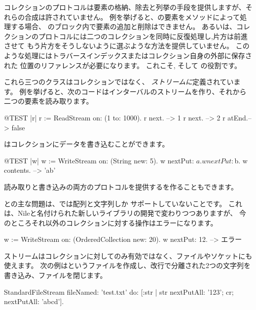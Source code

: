 \documentclass[a4paper,10pt,twoside]{book}
\begin{document}
コレクションのプロトコルは要素の格納、除去と列挙の手段を提供しますが、それらの合成は許されていません。
例を挙げると、の要素をメソッドによって処理する場合、
のブロック内で要素の追加と削除はできません。
あるいは、コレクションのプロトコルには二つのコレクションを同時に反復処理し,片方は前進させて
もう片方をそうしないように選ぶような方法を提供していません。
このような処理にはトラバースインデックスまたはコレクション自身の外部に保存された
位置のリファレンスが必要になります。
これこそ,   そして の役割です。



これら三つのクラスはコレクションではなく、 \emph{ストリームに}定義されています。
例を挙げると、次のコードはインターバルのストリームを作り、それから二つの要素を読み取ります。


\begin{code}{@TEST |r|}
r := ReadStream on: (1 to: 1000).
r next.   --> 1
r next.   --> 2
r atEnd.--> false
\end{code}

はコレクションにデータを書き込むことができます。


\begin{code}{@TEST |w|}
w := WriteStream on: (String new: 5).
w nextPut: $a.
w nextPut: $b.
w contents. -->  'ab'
\end{code}

読み取りと書き込みの両方のプロトコルを提供するを作ることもできます。

との主な問題は、\pharo では配列と文字列しか
サポートしていないことです。
これは、Nileと名付けられた新しいライブラリの開発で変わりつつありますが、
今のところそれ以外のコレクションに対する操作はエラーになります。

\begin{code}{}
w := WriteStream on: (OrderedCollection new: 20).
w nextPut: 12. -->  エラー
\end{code}

ストリームはコレクションに対してのみ有効ではなく、ファイルやソケットにも使えます。
次の例はというファイルを作成し、改行で分離された2つの文字列を書き込み、ファイルを閉じます。

\begin{code}{}
StandardFileStream
  fileNamed: 'test.txt'
  do: [:str | str
                nextPutAll: '123';
                cr;
                nextPutAll: 'abcd'].
\end{code}
\end{document}
